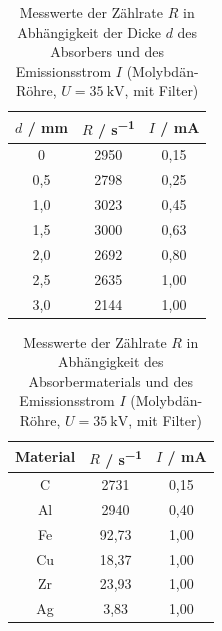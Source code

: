 \documentclass{article}
\begin{document}
\begin{table}[H]
    \centering
    \caption{Messwerte der Zählrate $R$ in Abhängigkeit der Dicke $d$ des Absorbers und des Emissionsstrom $I$ (Molybdän-Röhre, $U = \SI{35}{\kilo\volt}$, mit Filter)}
    \begin{tabular}{|c|c|c|}
        \hline
        $d$ / \si{\milli\meter} & $R$ / \si{\second \tothe{-1}} & $I$ / \si{\milli \ampere} \\ \hline \hline
         0 & 2950 & 0,15 \\ \hline
         0,5 & 2798 & 0,25 \\ \hline
         1,0 & 3023 & 0,45 \\ \hline
         1,5 & 3000 & 0,63 \\ \hline
         2,0 & 2692 & 0,80 \\ \hline
         2,5 & 2635 & 1,00 \\ \hline
         3,0 & 2144 & 1,00 \\ \hline
    \end{tabular}
    \label{tab:MesswerteAbschirmungDickeFilter}
\end{table}

\begin{table}[H]
    \centering
    \caption{Messwerte der Zählrate $R$ in Abhängigkeit des Absorbermaterials und des Emissionsstrom $I$ (Molybdän-Röhre, $U = \SI{35}{\kilo\volt}$, mit Filter)}
    \begin{tabular}{|c|c|c|}
        \hline
        Material & $R$ / \si{\second \tothe{-1}} & $I$ / \si{\milli \ampere} \\ \hline \hline
         C & 2731 & 0,15 \\ \hline
         Al & 2940 & 0,40 \\ \hline
         Fe & 92,73 & 1,00 \\ \hline
         Cu & 18,37 & 1,00 \\ \hline
         Zr & 23,93 & 1,00 \\ \hline
         Ag & 3,83 & 1,00 \\ \hline
    \end{tabular}
    \label{tab:MesswerteAbschirmungMaterialFilter}
\end{table}

\newpage
\printbibliography[heading=bibintoc]
\end{document}

